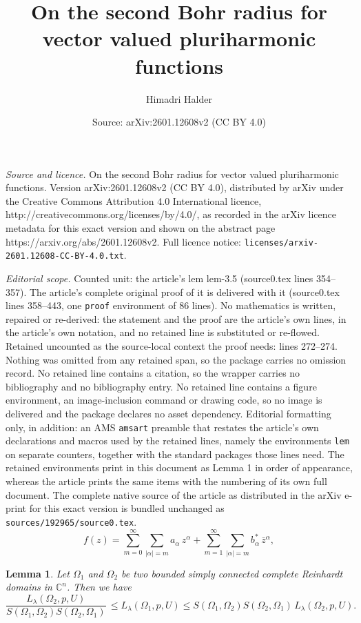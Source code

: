 \documentclass[10pt,a4paper]{amsart}
\title{On the second Bohr radius for vector valued pluriharmonic functions}
\author{Himadri Halder}
\date{Source: arXiv:2601.12608v2 (CC BY 4.0)}
\newtheorem{lem}{Lemma}
\begin{document}
\maketitle

\noindent\emph{Source and licence.} On the second Bohr radius for vector valued pluriharmonic functions. Version arXiv:2601.12608v2 (CC BY 4.0), distributed by arXiv under the Creative Commons Attribution 4.0 International licence, http://creativecommons.org/licenses/by/4.0/, as recorded in the arXiv licence metadata for this exact version and shown on the abstract page https://arxiv.org/abs/2601.12608v2. Full licence notice: \texttt{licenses/arxiv-2601.12608-CC-BY-4.0.txt}.\par\smallskip

\noindent\textit{Editorial scope.} Counted unit: the article's lem lem-3.5 (source0.tex lines 354--357). The article's complete original proof of it is delivered with it (source0.tex lines 358--443, one \texttt{proof} environment of 86 lines). No mathematics is written, repaired or re-derived: the statement and the proof are the article's own lines, in the article's own notation, and no retained line is substituted or re-flowed.  Retained uncounted as the source-local context the proof needs: lines 272--274.  Nothing was omitted from any retained span, so the package carries no omission record.  No retained line contains a citation, so the wrapper carries no bibliography and no bibliography entry.  No retained line contains a figure environment, an image-inclusion command or drawing code, so no image is delivered and the package declares no asset dependency.  Editorial formatting only, in addition: an AMS \texttt{amsart} preamble that restates the article's own declarations and macros used by the retained lines, namely the environments \texttt{lem} on separate counters, together with the standard packages those lines need.  The retained environments print in this document as Lemma 1 in order of appearance, whereas the article prints the same items with the numbering of its own full document.  The complete native source of the article as distributed in the arXiv e-print for this exact version is bundled unchanged as \texttt{sources/192965/source0.tex}.
	 \begin{equation} \label{e-1.3-a}
	 	f(z)=\sum_{m=0}^{\infty} \sum_{|\alpha|=m} a_{\alpha}\, z^{\alpha} + \sum_{m=1}^{\infty} \sum_{|\alpha|=m} b^{*}_{\alpha}\, \bar{z}^{\alpha},
	 \end{equation}

	 \begin{lem} \label{lem-3.5}
		Let $\Omega_{1}$ and $\Omega_{2}$ be two bounded simply connected complete Reinhardt domains in $\mathbb{C}^n$. Then we have $$\frac{L_{\lambda}(\Omega_{2}, p,U)}{S(\Omega_{1},\Omega_{2})S(\Omega_{2},\Omega_{1})} \, \leq L_{\lambda}(\Omega_{1}, p,U) \leq S(\Omega_{1},\Omega_{2})S(\Omega_{2},\Omega_{1}) \, L_{\lambda}(\Omega_{2}, p,U).
		$$
	\end{lem}
\end{document}
